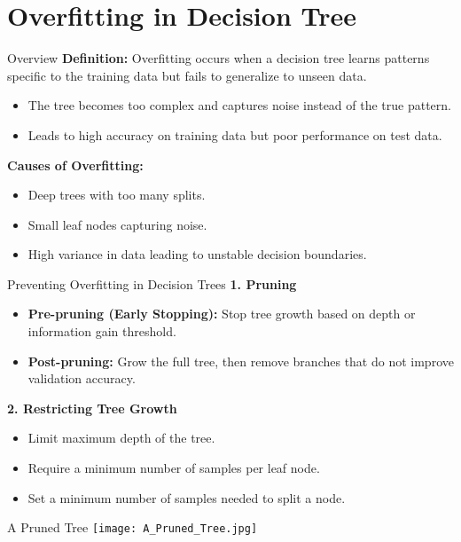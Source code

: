 \documentclass[serif, aspectratio=169]{beamer}
\begin{document}
\section{Overfitting in Decision Tree}

\begin{frame}{Overview}
    \textbf{Definition:} Overfitting occurs when a decision tree learns patterns specific to the training data but fails to generalize to unseen data.
    \begin{itemize}
        \item The tree becomes too complex and captures noise instead of the true pattern.
        \item Leads to high accuracy on training data but poor performance on test data.
    \end{itemize}
    \textbf{Causes of Overfitting:}
    \begin{itemize}
        \item Deep trees with too many splits.
        \item Small leaf nodes capturing noise.
        \item High variance in data leading to unstable decision boundaries.
    \end{itemize}
\end{frame}

\begin{frame}{Preventing Overfitting in Decision Trees}
    \textbf{1. Pruning}
    \begin{itemize}
        \item \textbf{Pre-pruning (Early Stopping):} Stop tree growth based on depth or information gain threshold.
        \item \textbf{Post-pruning:} Grow the full tree, then remove branches that do not improve validation accuracy.
    \end{itemize}
    \textbf{2. Restricting Tree Growth}
    \begin{itemize}
        \item Limit maximum depth of the tree.
        \item Require a minimum number of samples per leaf node.
        \item Set a minimum number of samples needed to split a node.
    \end{itemize}
\end{frame}


\begin{frame}{A Pruned Tree}
    \centering
    \texttt{[image: A\_Pruned\_Tree.jpg]}
\end{frame}
\end{document}
